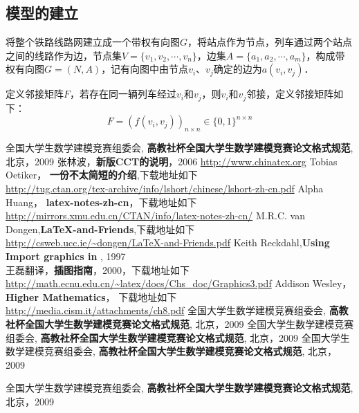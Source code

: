 \documentclass[UTF8]{ctexart}
\begin{document}
\subsection{模型的建立}
将整个铁路线路网建立成一个带权有向图$G$，将站点作为节点，列车通过两个站点之间的线路作为边，节点集$V = \{v_1,v_2,\cdots,v_n\}$，边集$A = \{a_1,a_2,\cdots,a_m\}$，构成带权有向图$G = (N,A)$，记有向图中由节点$v_i$、$v_j$确定的边为$a(v_i,v_j)$．

定义邻接矩阵$F$，若存在同一辆列车经过$v_i$和$v_j$，则$v_i$和$v_j$邻接，定义邻接矩阵如下：
$$F = (f(v_i,v_j))_{n\times n} \in \{0,1\}^{n \times n}$$



\begin{thebibliography}{10}
 全国大学生数学建模竞赛组委会, \textbf{高教社杯全国大学生数学建模竞赛论文格式规范}, 北京，2009
张林波，\textbf{新版CCT的说明}，2006
 \url{http://www.chinatex.org}
Tobias Oetiker， \textbf{一份不太简短的\LaTeXe 介绍},{下载地址如下}\\
    \url{http://tug.ctan.org/tex-archive/info/lshort/chinese/lshort-zh-cn.pdf}
 Alpha Huang， \textbf{latex-notes-zh-cn}，下载地址如下\\
    \url{http://mirrors.xmu.edu.cn/CTAN/info/latex-notes-zh-cn/}
M.R.C. van Dongen,\textbf{\LaTeX-and-Friends},下载地址如下\\
    \url{http://csweb.ucc.ie/~dongen/LaTeX-and-Friends.pdf}
Keith Reckdahl,\textbf{Using Import graphics in \LaTeXe}, 1997\\
王磊翻译，\textbf{\LaTeXe 插图指南}，2000，下载地址如下\\
\url{http://math.ecnu.edu.cn/~latex/docs/Chs_doc/Graphics3.pdf}
Addison Wesley，\textbf{Higher Mathematics}， 下载地址如下\\ \url{http://media.cism.it/attachments/ch8.pdf}
 全国大学生数学建模竞赛组委会, \textbf{高教社杯全国大学生数学建模竞赛论文格式规范}, 北京，2009
 全国大学生数学建模竞赛组委会, \textbf{高教社杯全国大学生数学建模竞赛论文格式规范}, 北京，2009
 全国大学生数学建模竞赛组委会, \textbf{高教社杯全国大学生数学建模竞赛论文格式规范}, 北京，2009

 全国大学生数学建模竞赛组委会, \textbf{高教社杯全国大学生数学建模竞赛论文格式规范}, 北京，2009
\end{thebibliography}
\end{document}
